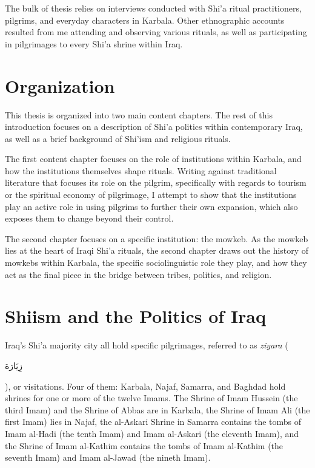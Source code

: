 The bulk of thesis relies on interviews conducted with Shi'a ritual practitioners, pilgrims, and everyday characters in Karbala. Other ethnographic accounts resulted from me attending and observing various rituals, as well as participating in pilgrimages to every Shi'a shrine within Iraq. 

\section{Organization}

This thesis is organized into two main content chapters. The rest of this introduction focuses on a description of Shi'a politics within contemporary Iraq, as well as a brief background of Shi'ism and religious rituals.

The first content chapter focuses on the role of institutions within Karbala, and how the institutions themselves shape rituals. Writing against traditional literature that focuses its role on the pilgrim, specifically with regards to tourism or the spiritual economy of pilgrimage, I attempt to show that the institutions play an active role in using pilgrims to further their own expansion, which also exposes them to change beyond their control. 

The second chapter focuses on a specific institution: the mowkeb. As the mowkeb lies at the heart of Iraqi Shi'a rituals, the second chapter draws out the history of mowkebs within Karbala, the specific sociolinguistic role they play, and how they act as the final piece in the bridge between tribes, politics, and religion. 

\section{Shiism and the Politics of Iraq}
Iraq's Shi'a majority city all hold specific pilgrimages, referred to as \emph{ziyara} (\begin{Arabic}زِيَارَة\end{Arabic}), or visitations. Four of them: Karbala, Najaf, Samarra, and Baghdad hold shrines for one or more of the twelve Imams. The Shrine of Imam Hussein (the third Imam) and the Shrine of Abbas are in Karbala, the Shrine of Imam Ali (the first Imam) lies in Najaf, the al-Askari Shrine in Samarra contains the tombs of Imam al-Hadi (the tenth Imam) and Imam al-Askari (the eleventh Imam), and the Shrine of Imam al-Kathim contains the tombs of Imam al-Kathim (the seventh Imam) and Imam al-Jawad (the nineth Imam). 

